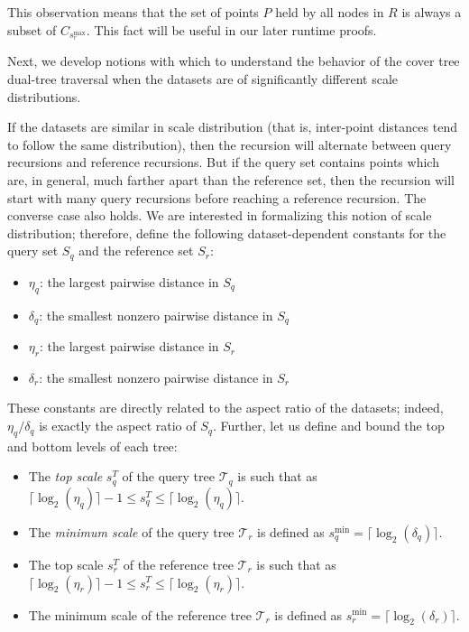 This observation means that the set of points $P$ held by all nodes in $R$ is
always a subset of $C_{s_r^{\max}}$.  This fact will be useful in our later
runtime proofs.

Next, we develop notions with which to understand the behavior of the cover tree
dual-tree traversal when the datasets are of significantly different scale
distributions.

If the datasets are similar in scale distribution (that is, inter-point distances
tend to follow the same distribution), then the recursion will alternate between
query recursions and reference recursions.  But if the query set contains points
which are, in general, much farther apart than the reference set, then the
recursion will start with many query recursions before reaching a reference
recursion.  The converse case also holds.  We are interested in formalizing
this notion of scale distribution; therefore, define the following
dataset-dependent constants for the query set $S_q$ and the reference set $S_r$:

\begin{itemize}
  \item $\eta_q$: the largest pairwise distance in $S_q$
  \item $\delta_q$: the smallest nonzero pairwise distance in $S_q$
  \item $\eta_r$: the largest pairwise distance in $S_r$
  \item $\delta_r$: the smallest nonzero pairwise distance in $S_r$
\end{itemize}

These constants are directly related to the aspect ratio of the datasets;
indeed, $\eta_q / \delta_q$ is exactly the aspect ratio of $S_q$.  Further,
let us define and bound the top and bottom levels of each tree:

\begin{itemize}
  \item The {\it top scale} $s_q^T$ of the query tree $\mathscr{T}_q$ is such
that as $\lceil \log_2(\eta_q) \rceil - 1 \le s_q^T \le \lceil \log_2(\eta_q)
\rceil$.
  \item The {\it minimum scale} of the query tree $\mathscr{T}_r$ is defined as
$s_q^{\min} = \lceil \log_2(\delta_q) \rceil$.
  \item The top scale $s_r^T$ of the reference tree $\mathscr{T}_r$ is such that
as $\lceil \log_2(\eta_r) \rceil - 1 \le s_r^T \le \lceil \log_2(\eta_r)
\rceil$.
  \item The minimum scale of the reference tree $\mathscr{T}_r$ is defined as
$s_r^{\min} = \lceil \log_2(\delta_r) \rceil$.
\end{itemize}

